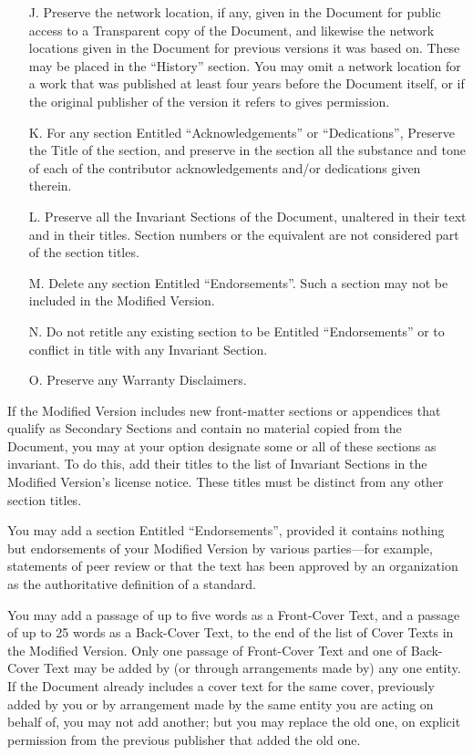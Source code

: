 \documentclass[]{report}
\theoremstyle{definition}
\theoremstyle{remark}
\theoremstyle{plain}
\numberwithin{equation}{chapter}
\begin{document}
\begin{multicols*}{2}
\begin{itemize}
	\item[J.]
	Preserve the network location, if any, given in the Document for
	public access to a Transparent copy of the Document, and likewise
	the network locations given in the Document for previous versions
	it was based on.  These may be placed in the ``History'' section.
	You may omit a network location for a work that was published at
	least four years before the Document itself, or if the original
	publisher of the version it refers to gives permission.

	\item[K.]
	For any section Entitled ``Acknowledgements'' or ``Dedications'',
	Preserve the Title of the section, and preserve in the section all
	the substance and tone of each of the contributor acknowledgements
	and/or dedications given therein.

	\item[L.]
	Preserve all the Invariant Sections of the Document,
	unaltered in their text and in their titles.  Section numbers
	or the equivalent are not considered part of the section titles.

	\item[M.]
	Delete any section Entitled ``Endorsements''.  Such a section
	may not be included in the Modified Version.

	\item[N.]
	Do not retitle any existing section to be Entitled ``Endorsements''
	or to conflict in title with any Invariant Section.

	\item[O.]
	Preserve any Warranty Disclaimers.
\end{itemize}

If the Modified Version includes new front-matter sections or
appendices that qualify as Secondary Sections and contain no material
copied from the Document, you may at your option designate some or all
of these sections as invariant.  To do this, add their titles to the
list of Invariant Sections in the Modified Version's license notice.
These titles must be distinct from any other section titles.

You may add a section Entitled ``Endorsements'', provided it contains
nothing but endorsements of your Modified Version by various
parties---for example, statements of peer review or that the text has
been approved by an organization as the authoritative definition of a
standard.

You may add a passage of up to five words as a Front-Cover Text, and a
passage of up to 25 words as a Back-Cover Text, to the end of the list
of Cover Texts in the Modified Version.  Only one passage of
Front-Cover Text and one of Back-Cover Text may be added by (or
through arrangements made by) any one entity.  If the Document already
includes a cover text for the same cover, previously added by you or
by arrangement made by the same entity you are acting on behalf of,
you may not add another; but you may replace the old one, on explicit
permission from the previous publisher that added the old one.


\end{multicols*}
\end{document}
